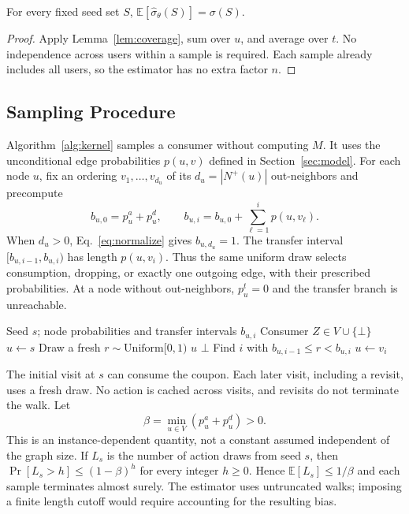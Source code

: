 \documentclass[sigconf]{acmart}
\newcommand{\E}{\mathbb{E}}
\begin{document}
\begin{lemma}[Unbiasedness]
\label{lem:unbiased}
For every fixed seed set $S$,
$\E[\hat{\sigma}_{\theta}(S)]=\sigma(S)$.
\end{lemma}

\begin{proof}
Apply Lemma~\ref{lem:coverage}, sum over $u$, and average over $t$.
No independence across users within a sample is required. Each sample
already includes all users, so the estimator has no extra factor $n$.
\end{proof}

\subsection{Sampling Procedure}

Algorithm~\ref{alg:kernel} samples a consumer without computing $M$.
It uses the unconditional edge probabilities $p(u,v)$ defined in
Section~\ref{sec:model}. For each node $u$, fix an ordering
$v_1,\ldots,v_{d_u}$ of its $d_u=|N^+(u)|$ out-neighbors and precompute
\[
  b_{u,0}=p_u^a+p_u^d,\qquad
  b_{u,i}=b_{u,0}+\sum_{\ell=1}^{i}p(u,v_\ell).
\]
When $d_u>0$, Eq.~\eqref{eq:normalize} gives $b_{u,d_u}=1$.
The transfer interval $[b_{u,i-1},b_{u,i})$ has length $p(u,v_i)$.
Thus the same uniform draw selects consumption, dropping, or exactly
one outgoing edge, with their prescribed probabilities. At a node
without out-neighbors, $p_u^t=0$ and the transfer branch is unreachable.

\begin{algorithm}[t]
\caption{Sample the Consumer of One Coupon}
\label{alg:kernel}
\begin{algorithmic}[1]
\Require Seed $s$; node probabilities and transfer intervals $b_{u,i}$
\Ensure Consumer $Z\in V\cup\{\bot\}$
\State $u\gets s$
  \State Draw a fresh $r\sim\mathrm{Uniform}[0,1)$
    \State \Return $u$
    \State \Return $\bot$
  \Else
    \State Find $i$ with $b_{u,i-1}\leq r<b_{u,i}$
    \State $u\gets v_i$
  \EndIf
\EndWhile
\end{algorithmic}
\end{algorithm}

The initial visit at $s$ can consume the coupon. Each later visit,
including a revisit, uses a fresh draw. No action is cached across
visits, and revisits do not terminate the walk.
Let
\[
  \beta=\min_{u\in V}(p_u^a+p_u^d)>0.
\]
This is an instance-dependent quantity, not a constant assumed
independent of the graph size. If $L_s$ is the number of action draws
from seed $s$, then $\Pr[L_s>h]\leq(1-\beta)^h$ for every integer
$h\geq0$. Hence $\E[L_s]\leq1/\beta$ and each sample terminates
almost surely. The estimator uses untruncated walks; imposing a finite
length cutoff would require accounting for the resulting bias.
\end{document}
